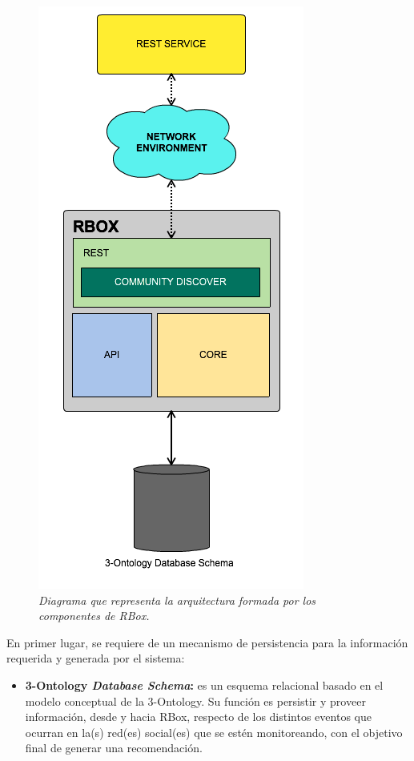 \begin{figure}
  \centering
  \includegraphics[scale=.6]{images/Figura4-1}
  \caption{\em Diagrama que representa la arquitectura formada por los componentes de RBox.}
  \label{fig:arq-im1}
\end{figure}


En primer lugar, se requiere de un mecanismo de persistencia para la información requerida y generada por el sistema:

\begin{itemize}
  \item \textbf{3-Ontology \textit{Database Schema}:} es un esquema relacional basado en el modelo conceptual de la 3-Ontology. Su función es persistir y proveer información, desde y hacia RBox, respecto de los distintos eventos que ocurran en la(s) red(es) social(es) que se estén monitoreando, con el objetivo final de generar una recomendación.
\end{itemize}

